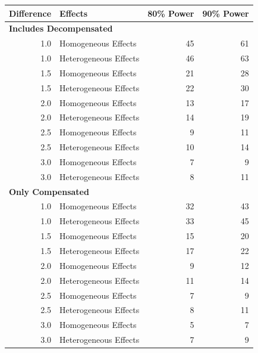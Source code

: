\documentclass[
]{article}
\begin{document}
\begin{table}[H]
\centering
\begin{tabular}{r|l|r|r}
\hline
Difference & Effects & 80\% Power & 90\% Power\\
\hline
\multicolumn{4}{l}{\textbf{Includes Decompensated}}\\
\hline
\hspace{1em}1.0 & Homogeneous Effects & 45 & 61\\
\hline
\hspace{1em}1.0 & Heterogeneous Effects & 46 & 63\\
\hline
\hspace{1em}1.5 & Homogeneous Effects & 21 & 28\\
\hline
\hspace{1em}1.5 & Heterogeneous Effects & 22 & 30\\
\hline
\hspace{1em}2.0 & Homogeneous Effects & 13 & 17\\
\hline
\hspace{1em}2.0 & Heterogeneous Effects & 14 & 19\\
\hline
\hspace{1em}2.5 & Homogeneous Effects & 9 & 11\\
\hline
\hspace{1em}2.5 & Heterogeneous Effects & 10 & 14\\
\hline
\hspace{1em}3.0 & Homogeneous Effects & 7 & 9\\
\hline
\hspace{1em}3.0 & Heterogeneous Effects & 8 & 11\\
\hline
\multicolumn{4}{l}{\textbf{Only Compensated}}\\
\hline
\hspace{1em}1.0 & Homogeneous Effects & 32 & 43\\
\hline
\hspace{1em}1.0 & Heterogeneous Effects & 33 & 45\\
\hline
\hspace{1em}1.5 & Homogeneous Effects & 15 & 20\\
\hline
\hspace{1em}1.5 & Heterogeneous Effects & 17 & 22\\
\hline
\hspace{1em}2.0 & Homogeneous Effects & 9 & 12\\
\hline
\hspace{1em}2.0 & Heterogeneous Effects & 11 & 14\\
\hline
\hspace{1em}2.5 & Homogeneous Effects & 7 & 9\\
\hline
\hspace{1em}2.5 & Heterogeneous Effects & 8 & 11\\
\hline
\hspace{1em}3.0 & Homogeneous Effects & 5 & 7\\
\hline
\hspace{1em}3.0 & Heterogeneous Effects & 7 & 9\\
\hline
\end{tabular}
\end{table}
\end{document}
